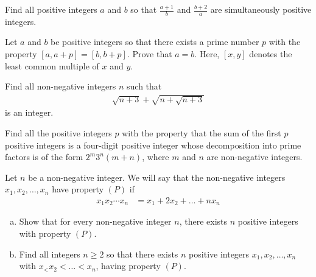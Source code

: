 \documentclass[problems.tex]{subfile}
\begin{document}
	\begin{problem}
		Find all positive integers $a$ and $b$ so that $\frac{a + 1}{b}$ and $\frac{b+2}{a}$ are simultaneously positive integers.
	\end{problem}

	\begin{problem}
		Let $a$ and $b$ be positive integers so that there exists a prime number $p$ with the property $[a, a + p] = [b, b + p]$. Prove that $a = b$. Here, $[x, y]$ denotes the least common multiple of $x$ and $y$.
	\end{problem}

	\begin{problem}
		Find all non-negative integers $n$ such that
		\begin{align*}
			\sqrt{n+3} + \sqrt{n+\sqrt{n+3}}
		\end{align*}
		is an integer.
	\end{problem}

	\begin{problem}
		Find all the positive integers $p$ with the property that the sum of the first $p$ positive integers is a four-digit positive integer whose decomposition into prime factors is of the form $2^m3^n(m + n)$, where $m$ and $n$ are non-negative integers.
	\end{problem}

	\begin{problem}
		Let $n$ be a non-negative integer. We will say that the non-negative integers $x_1, x_2, \dots, x_n$ have property $(P)$ if
			\begin{align*}
				x_1x_2 \cdots x_n
					& = x_1 + 2x_2  + \ldots + nx_n
			\end{align*}
		\begin{enumerate}[(a)]
			\item  Show that for every non-negative integer $n$, there exists $n$ positive integers with property $(P)$.
			\item Find all integers $n \geq 2$ so that there exists $n$ positive integers $x_1, x_2, \dots, x_n$	with $x_< x_2< \dots< x_n$, having property $(P)$.
		\end{enumerate}
	\end{problem}
\end{document}
